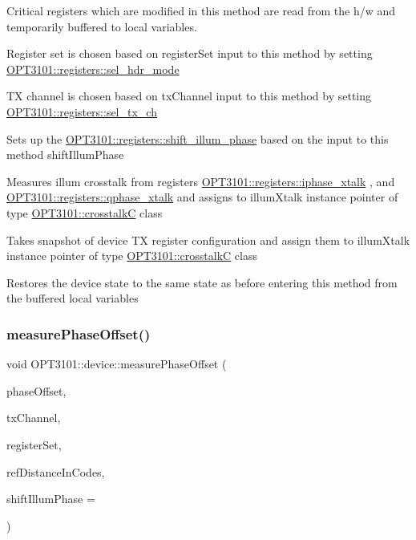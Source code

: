\begin{DoxyItemize}
\item Critical registers which are modified in this method are read from the h/w and temporarily buffered to local variables.
\item Register set is chosen based on register\+Set input to this method by setting \mbox{\hyperlink{class_o_p_t3101_1_1registers_a1f8f226c3e13479d0dafeb402d35d519}{O\+P\+T3101\+::registers\+::sel\+\_\+hdr\+\_\+mode}}
\item TX channel is chosen based on tx\+Channel input to this method by setting \mbox{\hyperlink{class_o_p_t3101_1_1registers_af79e0b3cfd511e7aa03cf3e55774f0d0}{O\+P\+T3101\+::registers\+::sel\+\_\+tx\+\_\+ch}}
\item Sets up the \mbox{\hyperlink{class_o_p_t3101_1_1registers_a18539cc6fd63ce4f504fcf16b1e48f31}{O\+P\+T3101\+::registers\+::shift\+\_\+illum\+\_\+phase}} based on the input to this method shift\+Illum\+Phase
\item Measures illum crosstalk from registers \mbox{\hyperlink{class_o_p_t3101_1_1registers_ae87864da6c35bed7c34ebf5f26ba4513}{O\+P\+T3101\+::registers\+::iphase\+\_\+xtalk}} , and \mbox{\hyperlink{class_o_p_t3101_1_1registers_ad94d98dfb26313a9d32c5c2c0c673693}{O\+P\+T3101\+::registers\+::qphase\+\_\+xtalk}} and assigns to illum\+Xtalk instance pointer of type \mbox{\hyperlink{class_o_p_t3101_1_1crosstalk_c}{O\+P\+T3101\+::crosstalkC}} class
\item Takes snapshot of device TX register configuration and assign them to illum\+Xtalk instance pointer of type \mbox{\hyperlink{class_o_p_t3101_1_1crosstalk_c}{O\+P\+T3101\+::crosstalkC}} class
\item Restores the device state to the same state as before entering this method from the buffered local variables 
\end{DoxyItemize}\mbox{\label{class_o_p_t3101_1_1device_a711d9737370bed043a85ced752c8ebb5}} 
\subsubsection{\texorpdfstring{measure\+Phase\+Offset()}{measurePhaseOffset()}}
{\footnotesize\ttfamily void O\+P\+T3101\+::device\+::measure\+Phase\+Offset (\begin{DoxyParamCaption}\item[{\mbox{\hyperlink{class_o_p_t3101_1_1phase_offset_c}{O\+P\+T3101\+::phase\+OffsetC}} $\ast$}]{phase\+Offset,  }\item[{uint8\+\_\+t}]{tx\+Channel,  }\item[{char}]{register\+Set,  }\item[{uint16\+\_\+t}]{ref\+Distance\+In\+Codes,  }\item[{uint8\+\_\+t}]{shift\+Illum\+Phase = {} }\end{DoxyParamCaption})}



